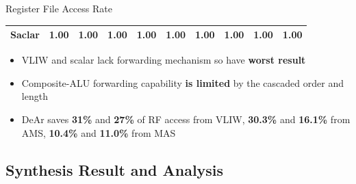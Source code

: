 \documentclass{beamer}
\begin{document}
\begin{CJK}{UTF8}{bkai}
\begin{frame}{Register File Access Rate}
\begin{table}[!ht]
{\begin{tabular}{|c|c|c|c|c|c|c|c|c|c|}
                            Saclar  &   1.00  &   1.00  &   1.00  &   1.00  &   1.00  &   1.00  &   1.00  &   1.00  &   1.00     \\ \hline 
                        \end{tabular}
                    }
                \end{table}
                \vspace{-1em}
                \begin{itemize}
                    \item <2->{VLIW and scalar lack forwarding mechanism so have \textbf{worst result}}
                    \item <3->{Composite-ALU forwarding capability \textbf{is limited} by the cascaded order and length}
                    \item <4->{DeAr saves \textbf{31\%} and \textbf{27\%} of RF access from VLIW,
                                \textbf{30.3\%} and \textbf{16.1\%} from AMS,
                                    \textbf{10.4\%} and \textbf{11.0\%} from MAS}
                \end{itemize}
            \end{frame}

            \subsection{Synthesis Result and Analysis}


\end{CJK}
\end{document}
